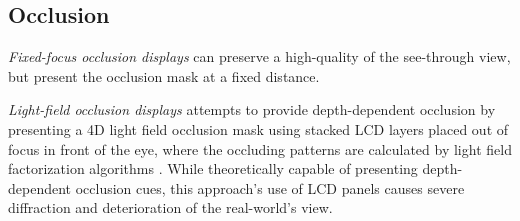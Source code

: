 \subsection{Occlusion}

\emph{Fixed-focus occlusion displays} \cite{Kiyokawa2000,Kiyokawa2001,Kiyokawa2003} can preserve a high-quality of the see-through view, but present the occlusion mask at a fixed distance. 

\emph{Light-field occlusion displays} \cite{maimone2013general} attempts to provide depth-dependent occlusion by presenting a 4D light field occlusion mask using stacked LCD layers placed out of focus in front of the eye, where the occluding patterns are calculated by light field factorization algorithms \cite{Lanman2010,Wetzstein2012}. 
While theoretically capable of presenting depth-dependent occlusion cues, this approach’s use of LCD panels causes severe diffraction and deterioration of the real-world’s view. 
